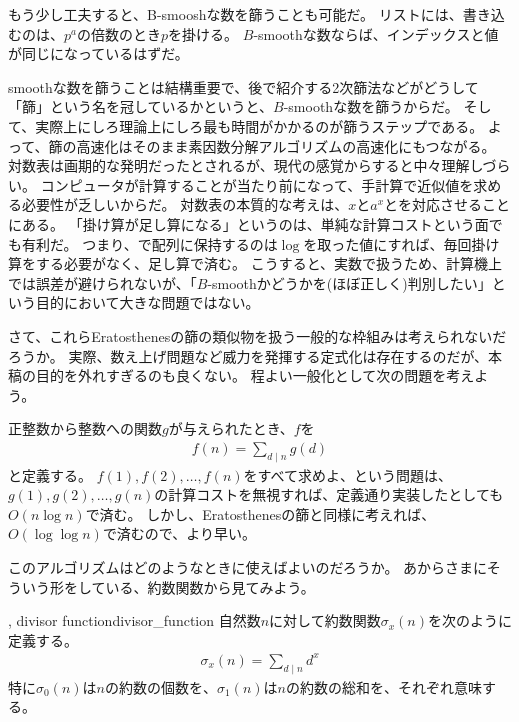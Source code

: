 
もう少し工夫すると、B-smooshな数を篩うことも可能だ。
リストには、書き込むのは、$p^a$の倍数のとき$p$を掛ける。
$B$-smoothな数ならば、インデックスと値が同じになっているはずだ。


smoothな数を篩うことは結構重要で、後で紹介する2次篩法などがどうして「篩」という名を冠しているかというと、$B$-smoothな数を篩うからだ。
そして、実際上にしろ理論上にしろ最も時間がかかるのが篩うステップである。
よって、篩の高速化はそのまま素因数分解アルゴリズムの高速化にもつながる。
対数表は画期的な発明だったとされるが、現代の感覚からすると中々理解しづらい。
コンピュータが計算することが当たり前になって、手計算で近似値を求める必要性が乏しいからだ。
対数表の本質的な考えは、$x$と$a^x$とを対応させることにある。
「掛け算が足し算になる」というのは、単純な計算コストという面でも有利だ。
つまり、で配列に保持するのは$\log$を取った値にすれば、毎回掛け算をする必要がなく、足し算で済む。
こうすると、実数で扱うため、計算機上では誤差が避けられないが、「$B$-smoothかどうかを(ほぼ正しく)判別したい」という目的において大きな問題ではない。

さて、これらEratosthenesの篩の類似物を扱う一般的な枠組みは考えられないだろうか。
実際、数え上げ問題など威力を発揮する定式化は存在するのだが、本稿の目的を外れすぎるのも良くない。
程よい一般化として次の問題を考えよう。

正整数から整数への関数$g$が与えられたとき、$f$を
\begin{align*}
f(n) = \sum_{d \mid n}g(d)
\end{align*}
と定義する。
$f(1),f(2),\ldots,f(n)$をすべて求めよ、という問題は、$g(1),g(2),\ldots,g(n)$の計算コストを無視すれば、定義通り実装したとしても$O(n\log{n})$で済む。
しかし、Eratosthenesの篩と同様に考えれば、$O(\log{\log{n}})$で済むので、より早い。


このアルゴリズムはどのようなときに使えばよいのだろうか。
あからさまにそういう形をしている、約数関数から見てみよう。

\begin{Defi}{, divisor function}{divisor_function}
自然数$n$に対して約数関数$\sigma_x(n)$を次のように定義する。
\begin{align*}
\sigma_x(n) = \sum_{d \mid n} d^x
\end{align*}
特に$\sigma_0(n)$は$n$の約数の個数を、$\sigma_1(n)$は$n$の約数の総和を、それぞれ意味する。
\end{Defi}


